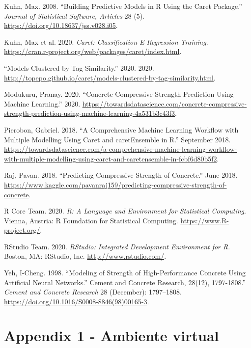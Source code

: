 \documentclass[]{article}
\begin{document}
\leavevmode\hypertarget{ref-Kuhn2008}{}%
Kuhn, Max. 2008. ``Building Predictive Models in R Using the Caret
Package.'' \emph{Journal of Statistical Software, Articles} 28 (5).
\url{https://doi.org/10.18637/jss.v028.i05}.

\leavevmode\hypertarget{ref-caret}{}%
Kuhn, Max et al. 2020. \emph{Caret: Classification E Regression
Training}.
\url{https://cran.r-project.org/web/packages/caret/index.html}.

\leavevmode\hypertarget{ref-modelsClusters}{}%
``Models Clustered by Tag Similarity.'' 2020. 2020.
\url{http://topepo.github.io/caret/models-clustered-by-tag-similarity.html}.

\leavevmode\hypertarget{ref-Modukuru2020}{}%
Modukuru, Pranay. 2020. ``Concrete Compressive Strength Prediction Using
Machine Learning.'' 2020.
\url{https://towardsdatascience.com/concrete-compressive-strength-prediction-using-machine-learning-4a531b3c43f3}.

\leavevmode\hypertarget{ref-Pierobon2018}{}%
Pierobon, Gabriel. 2018. ``A Comprehensive Machine Learning Workflow
with Multiple Modelling Using Caret and caretEnsemble in R.'' September
2018.
\url{https://towardsdatascience.com/a-comprehensive-machine-learning-workflow-with-multiple-modelling-using-caret-and-caretensemble-in-fcbf6d80b5f2}.

\leavevmode\hypertarget{ref-Raj2018}{}%
Raj, Pavan. 2018. ``Predicting Compressive Strength of Concrete.'' June
2018.
\url{https://www.kaggle.com/pavanraj159/predicting-compressive-strength-of-concrete}.

\leavevmode\hypertarget{ref-RCore}{}%
R Core Team. 2020. \emph{R: A Language and Environment for Statistical
Computing}. Vienna, Austria: R Foundation for Statistical Computing.
\url{https://www.R-project.org/}.

\leavevmode\hypertarget{ref-RStudio}{}%
RStudio Team. 2020. \emph{RStudio: Integrated Development Environment
for R}. Boston, MA: RStudio, Inc. \url{http://www.rstudio.com/}.

\leavevmode\hypertarget{ref-Yeh1998}{}%
Yeh, I-Cheng. 1998. ``Modeling of Strength of High-Performance Concrete
Using Artificial Neural Networks.'' Cement and Concrete Research,
28(12), 1797-1808.'' \emph{Cement and Concrete Research} 28 (December):
1797--1808. \url{https://doi.org/10.1016/S0008-8846(98)00165-3}.

\newpage

\hypertarget{appendix1}{%
\section{Appendix 1 - Ambiente virtual}\label{appendix1}}
\end{document}
